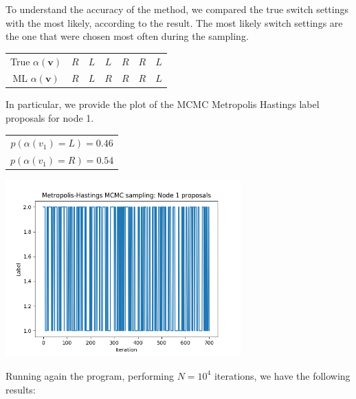\documentclass[]{article}
\begin{document}
To understand the accuracy of the method, we compared the true switch settings with the most likely, according to the result. The most likely switch settings are the one that were chosen most often during the sampling. 
\begin{center}
	\begin{tabular}{| c | c | c | c | c | c | c |}
		True $\alpha(\mathbf{v})$ & $R$ & $L$ & $L$ & $R$ & $R$ & $L$ \\
		ML $\alpha(\mathbf{v})$ & $R$ & $L$ & $R$ & $R$ & $R$ & $L$ \\
	\end{tabular}
\end{center}
In particular, we provide the plot of the MCMC Metropolis Hastings label proposals for node 1.
\begin{center}
	\begin{tabular}{| c |}
		$p(\alpha(v_1)=L) = 0.46 $ \\
		$p(\alpha(v_1)=R) = 0.54 $ \\
	\end{tabular}
\end{center}
\begin{center}
	\includegraphics[height=6.8cm]{task3/V_6_T_6_N_1000_Node1.png}
\end{center}
Running again the program, performing $N=10^4$ iterations, we have the following results:
\end{document}
